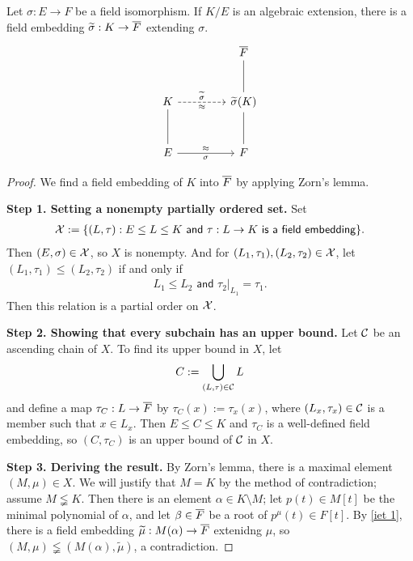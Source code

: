 \begin{thm}\label{iet 3}
    Let $\sigma: E\rightarrow F$ be a field isomorphism.
    If $K/E$ is an algebraic extension, there is a field embedding $\widetilde{\sigma}: K\rightarrow\overline{F}$ extending $\sigma$.
    \begin{equation*}
        \begin{tikzcd}[row sep=1.0cm, column sep=1.5cm]
            &   \ol F\\
            K\arrow[r, "\widetilde{\sigma}", "\approx"', dashed]
            &
            \widetilde{\sigma}(K)\arrow[u, dash]\\
            E\arrow[u, dash]\arrow[r, "\approx", "\sigma"']
            &
            F\arrow[u, dash]
        \end{tikzcd}
    \end{equation*}
\end{thm}
\begin{proof}
    We find a field embedding of $K$ into $\overline{F}$ by applying Zorn's lemma.

    \textbf{Step 1. Setting a nonempty partially ordered set.}\newline\noindent
    Set
    \begin{align*}
        {\mathcal{X}}:=\{(L, \tau): E\leq L\leq K\textsf{ and }\tau: L\rightarrow K\textsf{ is a field embedding}\}.
    \end{align*}
    Then $(E, \sigma)\in {\mathcal{X}}$, so $X$ is nonempty.
    And for $(L_1, \tau_1), (L_2, \tau_2)\in {\mathcal{X}}$, let $(L_1, \tau_1)\leq(L_2, \tau_2)$ if and only if
    \begin{align*}
        L_1\leq L_2\textsf{ and } \tau_2|_{L_1}=\tau_1.
    \end{align*}
    \color{brown}Then this relation is a partial order on ${\mathcal{X}}$.\color{black}

    \textbf{Step 2. Showing that every subchain has an upper bound.}\newline\noindent
    Let ${\mathcal{C}}$ be an ascending chain of $X$.
    To find its upper bound in $X$, let
    \begin{align*}
        C:=\bigcup_{(L, \tau)\in {\mathcal{C}}} L
    \end{align*}
    and define a map $\tau_C: L\rightarrow \overline{F}$ by $\tau_C(x):=\tau_x(x)$, where $(L_x, \tau_x)\in{\mathcal{C}}$ is a member such that $x\in L_x$.
    \color{brown}Then $E\leq C\leq K$ and $\tau_C$ is a well-defined field embedding, \color{black}so $(C, \tau_C)$ is an upper bound of ${\mathcal{C}}$ in $X$.

    \textbf{Step 3. Deriving the result.}\newline\noindent
    By Zorn's lemma, there is a maximal element $(M, \mu)\in X$.
    We will justify that $M=K$ by the method of contradiction; assume $M\lneqq K$.
    Then there is an element $\alpha\in K\setminus M$; let $p(t)\in M[t]$ be the minimal polynomial of $\alpha$, and let $\beta\in \overline{F}$ be a root of $p^\mu(t)\in F[t]$.
    By \cref{iet 1}, there is a field embedding $\widetilde{\mu}: M(\alpha)\rightarrow\overline{F}$ extenidng $\mu$, so $(M, \mu)\lneqq(M(\alpha), \widetilde{\mu})$, a contradiction.
\end{proof}
